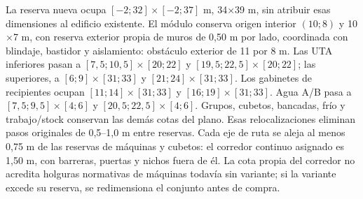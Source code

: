 La reserva nueva ocupa $[-2;32]\times[-2;37]$ m, 34$\times$39 m, sin atribuir esas dimensiones al edificio existente. El módulo conserva origen interior $(10;8)$ y 10$\times$7 m, con reserva exterior propia de muros de 0,50 m por lado, coordinada con blindaje, bastidor y aislamiento: obstáculo exterior de 11 por 8 m. Las UTA inferiores pasan a $[7,5;10,5]\times[20;22]$ y $[19,5;22,5]\times[20;22]$; las superiores, a $[6;9]\times[31;33]$ y $[21;24]\times[31;33]$. Los gabinetes de recipientes ocupan $[11;14]\times[31;33]$ y $[16;19]\times[31;33]$. Agua A/B pasa a $[7,5;9,5]\times[4;6]$ y $[20,5;22,5]\times[4;6]$. Grupos, cubetos, bancadas, frío y trabajo/stock conservan las demás cotas del plano. Esas relocalizaciones eliminan pasos originales de 0,5--1,0 m entre reservas. Cada eje de ruta se aleja al menos 0,75 m de las reservas de máquinas y cubetos: el corredor continuo asignado es 1,50 m, con barreras, puertas y nichos fuera de él. La cota propia del corredor no acredita holguras normativas de máquinas todavía sin variante; si la variante excede su reserva, se redimensiona el conjunto antes de compra.

